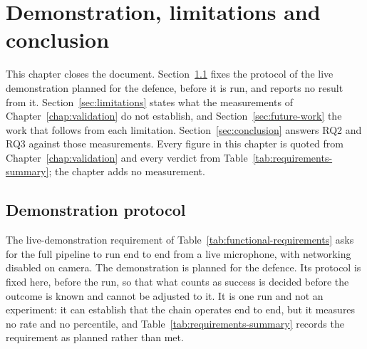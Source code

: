 %
%

\chapter{Demonstration, limitations and conclusion}
\label{chap:demonstration}
This chapter closes the document. Section~\ref{sec:demonstration-protocol} fixes the protocol of
the live demonstration planned for the defence, before it is run, and reports no result from it.
Section~\ref{sec:limitations} states what the measurements of Chapter~\ref{chap:validation} do not
establish, and Section~\ref{sec:future-work} the work that follows from each limitation.
Section~\ref{sec:conclusion} answers RQ2 and RQ3 against those measurements. Every figure in this
chapter is quoted from Chapter~\ref{chap:validation} and every verdict from
Table~\ref{tab:requirements-summary}; the chapter adds no measurement.

\section{Demonstration protocol}
\label{sec:demonstration-protocol}
The live-demonstration requirement of Table~\ref{tab:functional-requirements} asks for the full
pipeline to run end to end from a live microphone, with networking disabled on camera. The
demonstration is planned for the defence. Its protocol is fixed here, before the run, so that what
counts as success is decided before the outcome is known and cannot be adjusted to it. It is one
run and not an experiment: it can establish that the chain operates end to end, but it measures no
rate and no percentile, and Table~\ref{tab:requirements-summary} records the requirement as planned
rather than met.

